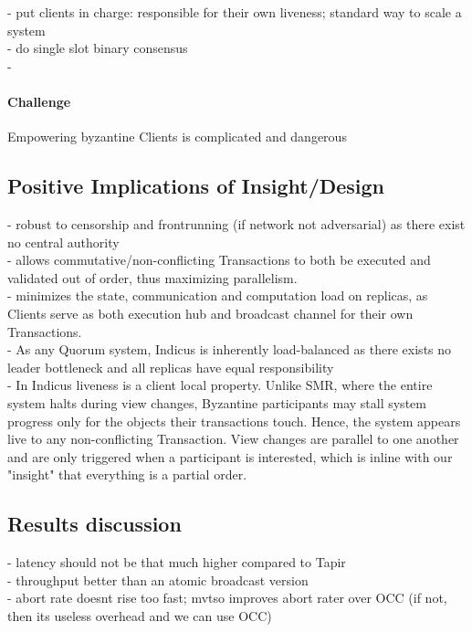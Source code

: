- put clients in charge: responsible for their own liveness;  standard way to scale a system\\
- do single slot binary consensus\\
-
\paragraph{Challenge} Empowering byzantine Clients is complicated and dangerous

\subsection{Positive Implications of Insight/Design}
- robust to censorship and frontrunning (if network not adversarial) as there exist no central authority \\
-  allows commutative/non-conflicting Transactions to both be executed and validated out of order, thus maximizing parallelism. \\
-  minimizes the state, communication and computation load on replicas, as Clients serve as both execution hub and broadcast channel for their own Transactions. \\
- As any Quorum system, Indicus is inherently load-balanced as there exists no leader bottleneck and all replicas have equal responsibility\\
- In Indicus liveness is a client local property. Unlike SMR, where the entire system halts during view changes, Byzantine participants may stall system progress only for the objects their transactions touch. Hence, the system appears live to any non-conflicting Transaction. View changes are parallel to one another and are only triggered when a participant is interested, which is inline with our "insight" that everything is a partial order.

\subsection{Results discussion}
- latency should not be that much higher compared to Tapir\\
- throughput better than an atomic broadcast version\\
- abort rate doesnt rise too fast; mvtso improves abort rater over OCC (if not, then its useless overhead and we can use OCC)


